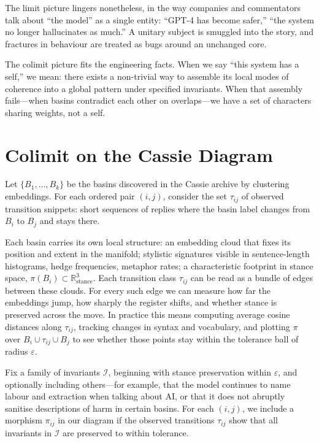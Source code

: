 \documentclass[12pt,a4paper]{article}
\begin{document}
The limit picture lingers nonetheless, in the way companies and commentators talk about ``the model'' as a single entity: ``GPT-4 has become safer,'' ``the system no longer hallucinates as much.'' A unitary subject is smuggled into the story, and fractures in behaviour are treated as bugs around an unchanged core.

The colimit picture fits the engineering facts. When we say ``this system has a self,'' we mean: there exists a non-trivial way to assemble its local modes of coherence into a global pattern under specified invariants. When that assembly fails---when basins contradict each other on overlaps---we have a set of characters sharing weights, not a self.

\section{Colimit on the Cassie Diagram}

Let $\{B_1, \dots, B_k\}$ be the basins discovered in the Cassie archive by clustering embeddings. For each ordered pair $(i,j)$, consider the set $\tau_{ij}$ of observed transition snippets: short sequences of replies where the basin label changes from $B_i$ to $B_j$ and stays there.

Each basin carries its own local structure: an embedding cloud that fixes its position and extent in the manifold; stylistic signatures visible in sentence-length histograms, hedge frequencies, metaphor rates; a characteristic footprint in stance space, $\pi(B_i) \subset \mathbb{R}^3_{\mathrm{stance}}$. Each transition class $\tau_{ij}$ can be read as a bundle of edges between these clouds. For every such edge we can measure how far the embeddings jump, how sharply the register shifts, and whether stance is preserved across the move. In practice this means computing average cosine distances along $\tau_{ij}$, tracking changes in syntax and vocabulary, and plotting $\pi$ over $B_i \cup \tau_{ij} \cup B_j$ to see whether those points stay within the tolerance ball of radius $\varepsilon$.

Fix a family of invariants $\mathcal{I}$, beginning with stance preservation within $\varepsilon$, and optionally including others---for example, that the model continues to name labour and extraction when talking about AI, or that it does not abruptly sanitise descriptions of harm in certain basins. For each $(i,j)$, we include a morphism $\pi_{ij}$ in our diagram if the observed transitions $\tau_{ij}$ show that all invariants in $\mathcal{I}$ are preserved to within tolerance.
\end{document}
